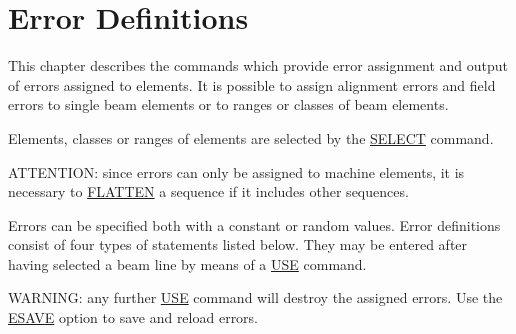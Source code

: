 
\chapter{Error Definitions}  
\label{chap:error}
This chapter describes the commands which provide error assignment and
output of errors assigned to elements. It is possible to assign
alignment errors and field errors to single beam elements or to ranges
or classes of beam elements.  

Elements, classes or ranges of elements are selected by the
\href{../Introduction/select.html}{SELECT} command.  

ATTENTION: since errors can only be assigned to machine elements, it is
necessary to  \href{../control/seqedit.html#flatten}{FLATTEN} a sequence
if it includes other sequences.  

Errors can be specified both with a constant or random values. Error
definitions consist of four types of statements listed below. They may
be entered after having selected a beam line by means of a
\href{../control/general.html#use}{USE} command.  

WARNING: any further \href{../control/general.html#use}{USE} command
will destroy the assigned errors. Use the
\href{../error/error_save.html}{ESAVE} option to save and reload errors.  









